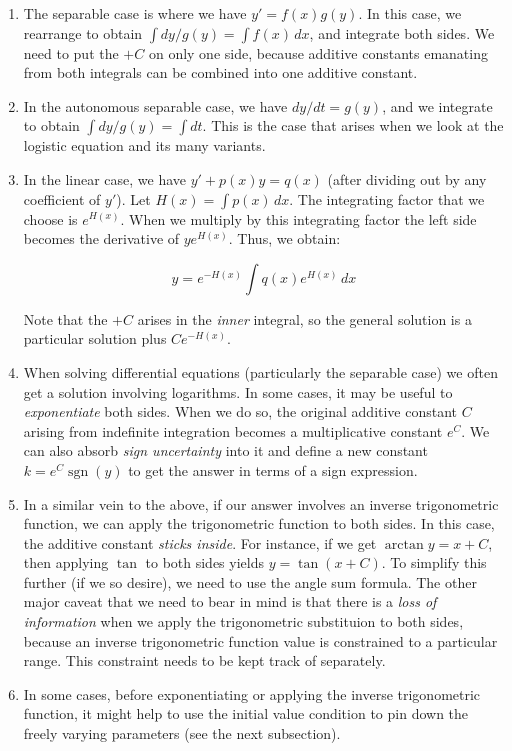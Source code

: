 \documentclass[10pt]{amsart}
\begin{document}
\begin{enumerate}

\item The separable case is where we have $y' = f(x)g(y)$. In this
  case, we rearrange to obtain $\int dy/g(y) = \int f(x) \, dx$, and
  integrate both sides. We need to put the $+C$ on only one side,
  because additive constants emanating from both integrals can be
  combined into one additive constant.
\item In the autonomous separable case, we have $dy/dt = g(y)$, and we
  integrate to obtain $\int dy/g(y) = \int dt$. This is the case that
  arises when we look at the logistic equation and its many variants.
\item In the linear case, we have $y' + p(x)y = q(x)$ (after dividing
  out by any coefficient of $y'$). Let $H(x) = \int p(x) \, dx$. The
  integrating factor that we choose is $e^{H(x)}$. When we multiply by
  this integrating factor the left side becomes the derivative of
  $ye^{H(x)}$. Thus, we obtain:

  $$y = e^{-H(x)} \int q(x)e^{H(x)} \, dx$$

  Note that the $+C$ arises in the {\em inner} integral, so the
  general solution is a particular solution plus $Ce^{-H(x)}$.
\item When solving differential equations (particularly the separable
  case) we often get a solution involving logarithms. In some cases,
  it may be useful to {\em exponentiate} both sides. When we do so,
  the original additive constant $C$ arising from indefinite
  integration becomes a multiplicative constant $e^C$. We can also
  absorb {\em sign uncertainty} into it and define a new constant $k =
  e^C\operatorname{sgn}(y)$ to get the answer in terms of a sign
  expression.
\item In a similar vein to the above, if our answer involves an
  inverse trigonometric function, we can apply the trigonometric
  function to both sides. In this case, the additive constant {\em
  sticks inside}. For instance, if we get $\arctan y = x + C$, then
  applying $\tan$ to both sides yields $y = \tan(x + C)$. To simplify
  this further (if we so desire), we need to use the angle sum
  formula. The other major caveat that we need to bear in mind is that
  there is a {\em loss of information} when we apply the trigonometric
  substituion to both sides, because an inverse trigonometric function
  value is constrained to a particular range. This constraint needs to
  be kept track of separately.
\item In some cases, before exponentiating or applying the inverse
  trigonometric function, it might help to use the initial value
  condition to pin down the freely varying parameters (see the next
  subsection).
\end{enumerate}
\end{document}

